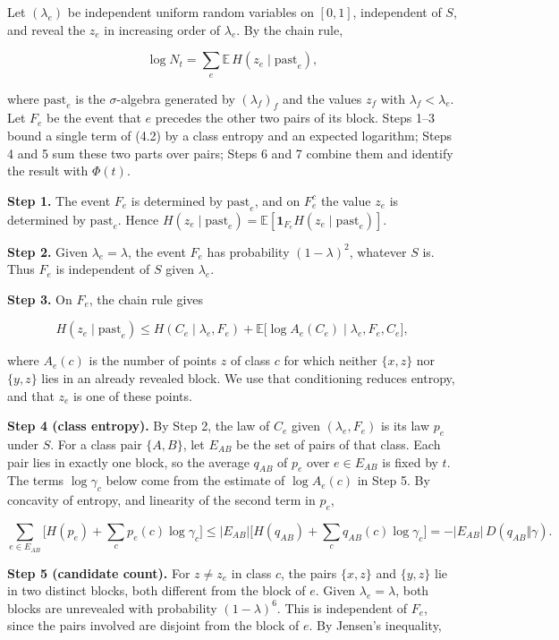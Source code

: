 \documentclass[english,11pt,a4paper]{article}
\begin{document}
Let \((\lambda_e)\) be independent uniform random variables on \([0,1]\), independent of \(S\), and reveal the \(z_e\) in increasing order of \(\lambda_e\). By the chain rule,

\nopagebreak[4]
\[\log N_t=\sum_e\mathbb E\,H(z_e\mid\mathrm{past}_e),\tag{4.2}\]

where \(\mathrm{past}_e\) is the \(\sigma\)-algebra generated by \((\lambda_f)_f\) and the values \(z_f\) with \(\lambda_f<\lambda_e\). Let \(F_e\) be the event that \(e\) precedes the other two pairs of its block. Steps 1--3 bound a single term of (4.2) by a class entropy and an expected logarithm; Steps 4 and 5 sum these two parts over pairs; Steps 6 and 7 combine them and identify the result with \(\Phi(t)\).

\textbf{Step 1.} The event \(F_e\) is determined by \(\mathrm{past}_e\), and on \(F_e^c\) the value \(z_e\) is determined by \(\mathrm{past}_e\). Hence \(H(z_e\mid\mathrm{past}_e)=\mathbb E[\mathbf 1_{F_e}H(z_e\mid\mathrm{past}_e)]\).

\textbf{Step 2.} Given \(\lambda_e=\lambda\), the event \(F_e\) has probability \((1-\lambda)^2\), whatever \(S\) is. Thus \(F_e\) is independent of \(S\) given \(\lambda_e\).

\textbf{Step 3.} On \(F_e\), the chain rule gives

\nopagebreak[4]
\[H(z_e\mid\mathrm{past}_e)\le H(C_e\mid\lambda_e,F_e)+\mathbb E\big[\log A_e(C_e)\mid\lambda_e,F_e,C_e\big],\]

where \(A_e(c)\) is the number of points \(z\) of class \(c\) for which neither \(\{x,z\}\) nor \(\{y,z\}\) lies in an already revealed block. We use that conditioning reduces entropy, and that \(z_e\) is one of these points.

\textbf{Step 4 (class entropy).} By Step 2, the law of \(C_e\) given \((\lambda_e,F_e)\) is its law \(p_e\) under \(S\). For a class pair \(\{A,B\}\), let \(E_{AB}\) be the set of pairs of that class. Each pair lies in exactly one block, so the average \(q_{AB}\) of \(p_e\) over \(e\in E_{AB}\) is fixed by \(t\). The terms \(\log\gamma_c\) below come from the estimate of \(\log A_e(c)\) in Step 5. By concavity of entropy, and linearity of the second term in \(p_e\),

\nopagebreak[4]
\[\sum_{e\in E_{AB}}\Big[H(p_e)+\sum_c p_e(c)\log\gamma_c\Big]\le|E_{AB}|\Big[H(q_{AB})+\sum_c q_{AB}(c)\log\gamma_c\Big]=-|E_{AB}|\,D(q_{AB}\Vert\gamma).\]

\textbf{Step 5 (candidate count).} For \(z\ne z_e\) in class \(c\), the pairs \(\{x,z\}\) and \(\{y,z\}\) lie in two distinct blocks, both different from the block of \(e\). Given \(\lambda_e=\lambda\), both blocks are unrevealed with probability \((1-\lambda)^6\). This is independent of \(F_e\), since the pairs involved are disjoint from the block of \(e\). By Jensen's inequality,
\end{document}
